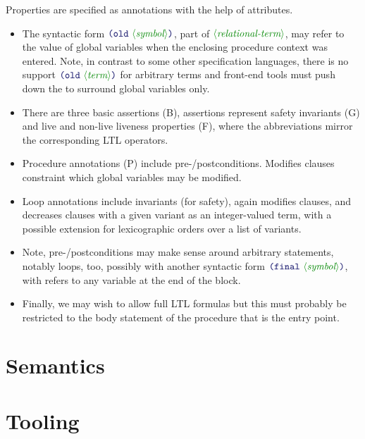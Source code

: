 \documentclass[runningheads]{llncs}
\begin{document}
Properties are specified as annotations with the help of attributes.
\begin{itemize}
\item The syntactic form $\LP\terminal{old}~\nonterminal{symbol}\RP$,
      part of $\nonterminal{relational-term}$,
      may refer to the value of global variables
      when the enclosing procedure context was entered.
      Note, in contrast to some other specification languages,
      there is no support $\LP\terminal{old}~\nonterminal{term}\RP$
      for arbitrary terms and front-end tools must push down
      the  to surround global variables only.
\item There are three basic assertions (B), assertions represent safety invariants (G)
      and live and non-live liveness properties (F),
      where the abbreviations mirror the corresponding LTL operators.
\item Procedure annotations (P) include pre-/postconditions.
      Modifies clauses constraint which global variables may be modified.
\item Loop annotations include invariants (for safety),
      again modifies clauses,
      and decreases clauses with a given variant as an integer-valued term,
      with a possible extension for lexicographic orders
      over a list of variants.
\item Note, pre-/postconditions may make sense around arbitrary statements,
      notably loops,
      too, possibly with another syntactic form $\LP\terminal{final}~\nonterminal{symbol}\RP$,
      with refers to any variable at the end of the block.
\item Finally, we may wish to allow full LTL formulas
      but this must probably be restricted to the body statement
      of the procedure that is the entry point.
\end{itemize}

\section{Semantics}

\section{Tooling}
\end{document}
